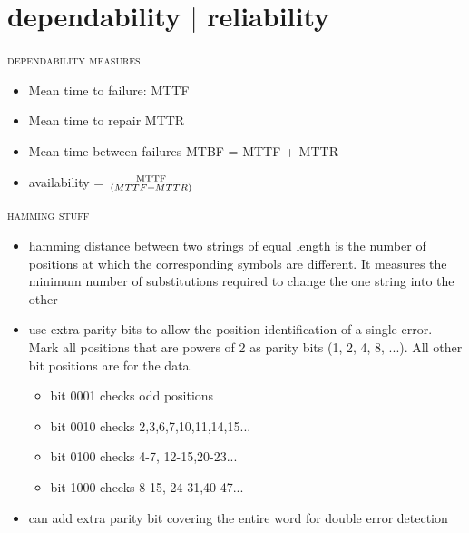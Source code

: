 \documentclass{article}
\begin{document}
\section{dependability $|$ reliability} %
\label{sec:dependability_reliability}
\begin{center}\textsc{dependability measures}\end{center} 
	\begin{itemize}
		\item Mean time to failure: MTTF
		\item Mean time to repair MTTR
		\item Mean time between failures MTBF = MTTF + MTTR
		\item availability = $\frac{\text{MTTF}}{\text(MTTF+MTTR)} $
	\end{itemize}
\begin{center}\textsc{hamming stuff}\end{center} 
	\begin{itemize}
		\item hamming distance between two strings of equal length is the number of positions at which the corresponding symbols are different. It measures the minimum number of substitutions required to change the one string into the other
		\item use extra parity bits to allow the position identification of a single error. Mark all positions that are powers of 2 as parity bits (1, 2, 4, 8, ...). All other bit positions are for the data.
		\begin{itemize}
			\item bit 0001 checks odd positions
			\item bit 0010 checks 2,3,6,7,10,11,14,15...
			\item bit 0100 checks 4-7, 12-15,20-23...
			\item bit 1000 checks 8-15, 24-31,40-47...
		\end{itemize}
		\item can add extra parity bit covering the entire word for double error detection
	\end{itemize}
\end{document}
